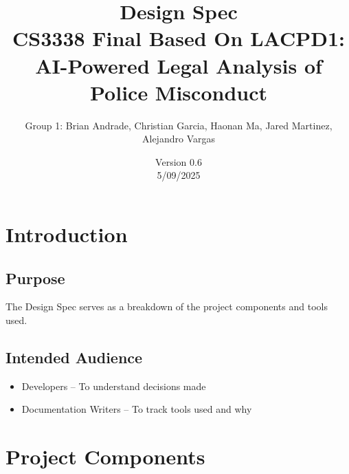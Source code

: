 \documentclass[11pt]{article}
\title{Design Spec \\
CS3338 Final Based On LACPD1: AI-Powered Legal Analysis of Police Misconduct}
\author{Group 1: Brian Andrade, Christian Garcia, Haonan Ma, Jared Martinez, Alejandro Vargas}
\date{Version 0.6 \\ 5/09/2025}
\begin{document}
\maketitle
\thispagestyle{empty}
\newpage

\tableofcontents
\thispagestyle{empty}
\newpage

\newpage
\section{Introduction}
\subsection{Purpose}
The Design Spec serves as a breakdown of the project components and tools used.

\subsection{Intended Audience}
\begin{itemize}
\item Developers – To understand decisions made
\item Documentation Writers – To track tools used and why
\end{itemize}

\newpage
\section{Project Components}
\end{document}
